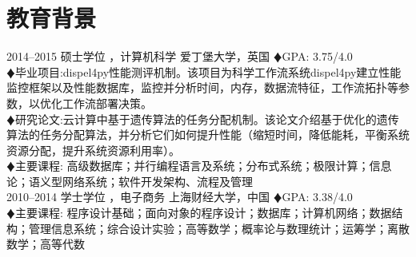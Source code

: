\documentclass[]{friggeri-cv-cn} %
\begin{document}
\section{教育背景}

\begin{entrylist}
\entry
{2014--2015}
{硕士学位 {\normalfont ，计算机科学}}
{爱丁堡大学，英国}
{
{\color{red} $\vardiamondsuit $}GPA: 3.75/4.0\\
{\color{red} $\vardiamondsuit $}毕业项目:dispel4py性能测评机制。该项目为科学工作流系统dispel4py建立性能监控框架以及性能数据库，监控并分析时间，内存，数据流特征，工作流拓扑等参数，以优化工作流部署决策。\\
{\color{red} $\vardiamondsuit $}研究论文:云计算中基于遗传算法的任务分配机制。该论文介绍基于优化的遗传算法的任务分配算法，并分析它们如何提升性能（缩短时间，降低能耗，平衡系统资源分配，提升系统资源利用率）。\\
{\color{red} $\vardiamondsuit $}主要课程:
高级数据库；并行编程语言及系统；分布式系统；极限计算；信息论；语义型网络系统；软件开发架构、流程及管理
}
\\
\entry
{2010--2014}
{学士学位 {\normalfont ，电子商务}}
{上海财经大学，中国}
{
{\color{red} $\vardiamondsuit $}GPA: 3.38/4.0\\
{\color{red} $\vardiamondsuit $}主要课程:
程序设计基础；面向对象的程序设计；数据库；计算机网络；数据结构；管理信息系统；综合设计实验；高等数学；概率论与数理统计；运筹学；离散数学；高等代数
}
\end{entrylist}


%
\end{document}
